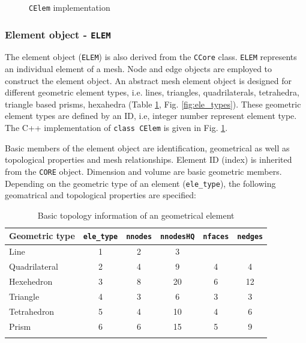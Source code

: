 %
\begin{figure}[H]
\centering
{}
\caption{\texttt{CElem} implementation}
\label{fig:gelee}
\end{figure}
%

\subsubsection{Element object - \texttt{ELEM}}
\label{sec:elem}

The element object (\texttt{ELEM}) is also derived from the
\texttt{CCore} class. \texttt{ELEM} represents an individual
element of a mesh. Node and edge objects are employed to construct
the element object. An abstract mesh element object is designed
for different geometric element types, i.e. lines, triangles,
quadrilaterals, tetrahedra, triangle based prisms, hexahedra
(Table \ref{tab:elem}, Fig. \ref{fig:ele_types}). These geometric
element types are defined by an ID, i.e, integer number represent
element type.
The C++ implementation of \texttt{class CElem} is given in Fig.
\ref{fig:gelee}.

Basic members of the element object are identification,
geometrical as well as topological properties and mesh
relationships.
%
Element ID (index) is inherited from the \texttt{CORE} object.
Dimension and volume are basic geometric members. Depending on the
geometric type of an element (\texttt{ele\_type}), the following
 geomatrical and topological properties are specified:

\begin{table}[H]
\caption{Basic topology information of an geometrical element}
\begin{center}
\begin{tabular}{lccccc}
\hline
Geometric type  & \texttt{ele\_type}&\texttt{nnodes}& \texttt{nnodesHQ}& \texttt{nfaces} & \texttt{nedges}\\
\hline
Line &1& 2&3& &\\
Quadrilateral&2&4&9& 4&4\\
Hexehedron&3& 8&20& 6&12\\
Triangle&4&  3&6& 3&3\\
Tetrahedron & 5& 4&10& 4&6\\
Prism &6  & 6&15& 5&9\\
\hline
\label{tab:elem}
\end{tabular}
\end{center}
\end{table}


